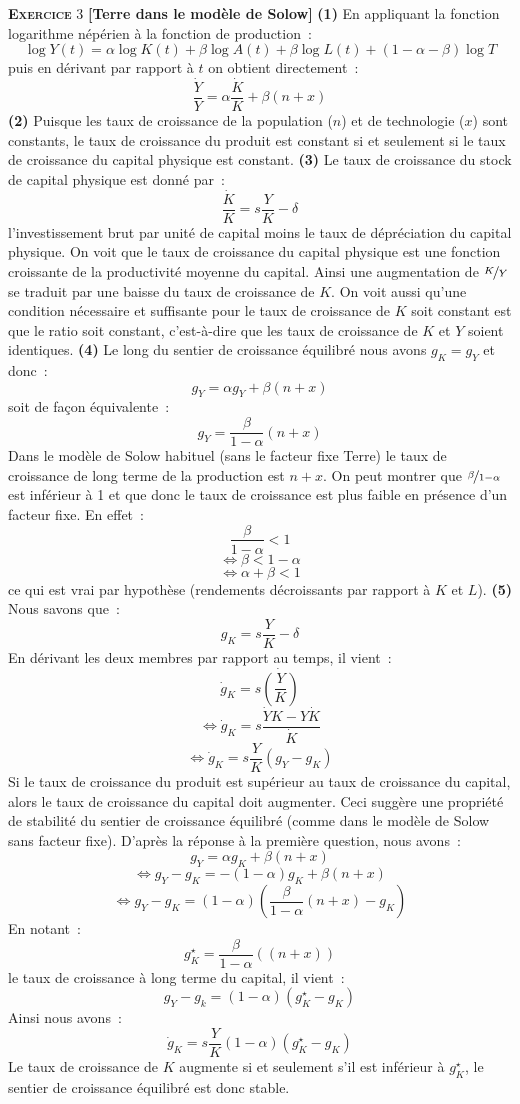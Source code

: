 \documentclass[10pt,a4paper,notitlepage,onecolumn]{article}
\newcommand{\exercice}[2]{\textsc{\textbf{Exercice}} #1 \textbf{[#2]}}
\newcommand{\question}[1]{\textbf{(#1)}}
\newcommand{\growth}[1]{\frac{\dot{#1}}{#1}}
\begin{document}
\bigskip

\exercice{3}{Terre dans le modèle de Solow} \question{1} En appliquant
la fonction  logarithme népérien à  la fonction de production :
\[
\log Y(t) = \alpha \log K(t) + \beta \log A(t) + \beta \log L(t) + (1-\alpha-\beta) \log T
\]
puis en dérivant par rapport à $t$ on obtient directement :
\[
\growth{Y} = \alpha\growth{K} + \beta (n+x)
\]
\question{2} Puisque les taux de  croissance de la population ($n$) et
de technologie ($x$) sont constants,  le taux de croissance du produit
est  constant si  et seulement  si le  taux de  croissance du  capital
physique est constant. \question{3} Le  taux de croissance du stock de
capital physique est donné par :
\[
\growth{K} = s\frac{Y}{K} - \delta
\]
l'investissement  brut  par   unité  de  capital  moins   le  taux  de
dépréciation du capital physique. On voit que le taux de croissance du
capital  physique  est  une  fonction croissante  de  la  productivité
moyenne du  capital.  Ainsi  une augmentation de  $\nicefrac{K}{Y}$ se
traduit par  une baisse du  taux de croissance  de $K$. On  voit aussi
qu'une condition nécessaire  et suffisante pour le  taux de croissance
de $K$ soit  constant est que le ratio   soit constant,
c'est-à-dire  que  les  taux  de  croissance  de  $K$  et  $Y$  soient
identiques. \question{4}  Le long  du sentier de  croissance équilibré
nous avons $g_K=g_Y$ et donc :
\[
g_{Y} = \alpha g_{Y} + \beta (n+x)
\]
soit de façon équivalente :
\[
g_Y = \frac{\beta}{1-\alpha}(n+x)
\]
Dans le modèle de Solow habituel  (sans le facteur fixe Terre) le taux
de  croissance de  long  terme de  la production  est  $n+x$. On  peut
montrer que $\nicefrac{\beta}{1-\alpha}$ est inférieur à 1 et que donc
le  taux  de croissance  est  plus  faible  en présence  d'un  facteur
fixe. En effet :
\[
\frac{\beta}{1-\alpha}<1
\]
\[
\Leftrightarrow \beta < 1-\alpha
\]
\[
\Leftrightarrow \alpha + \beta < 1
\]
ce qui est  vrai par hypothèse (rendements décroissants  par rapport à
$K$ et $L$). \question{5} Nous savons que :
\[
g_K = s\frac{Y}{K} - \delta
\]
En dérivant les deux membres par rapport au temps, il vient :
\[
\dot g_K = s \dot{\left(\frac{Y}{K}\right)}
\]
\[
\Leftrightarrow \dot g_K = s \frac{\dot Y K - Y \dot K}{\dot K}
\]
\[
\Leftrightarrow \dot g_K = s \frac{Y}{K}\left(g_Y-g_K\right)
\]
Si  le  taux  de  croissance  du produit  est  supérieur  au  taux  de
croissance du  capital, alors  le taux de  croissance du  capital doit
augmenter.   Ceci suggère  une propriété  de stabilité  du sentier  de
croissance  équilibré (comme  dans  le modèle  de  Solow sans  facteur
fixe). D'après la réponse à la première question, nous avons :
\[
g_Y = \alpha g_K + \beta (n+x)
\]
\[
\Leftrightarrow g_Y-g_K = -(1-\alpha) g_K + \beta (n+x)
\]
\[
\Leftrightarrow g_Y-g_K = (1-\alpha) \left(\frac{\beta}{1-\alpha}(n+x)-g_K\right)
\]
En notant :
\[
g_K^{\star} = \frac{\beta}{1-\alpha}((n+x))
\]
le taux de croissance à long terme du capital, il vient :
\[
g_Y - g_k = (1-\alpha)\left(g_K^{\star}-g_K\right)
\]
Ainsi nous avons :
\[
\dot g_K = s\frac{Y}{K}(1-\alpha)\left(g_K^{\star}-g_K\right)
\]
Le  taux de  croissance  de  $K$ augmente  si  et  seulement s'il  est
inférieur à $g_K^{\star}$, le sentier de croissance équilibré est donc
stable.\newline
\end{document}
